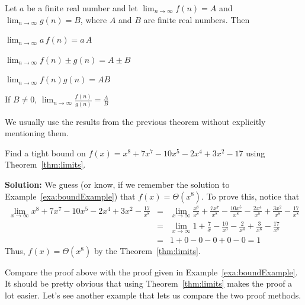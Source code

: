 \begin{thm}\label{limitProps2}
Let $a$ be a finite real number and let $\displaystyle\lim_{n\rightarrow \infty} f(n)=A$ and 
$\displaystyle\lim_{n\rightarrow \infty} g(n)=B$, where $A$ and $B$ are finite real numbers. 
Then
\begin{lenum}
\item 
$\displaystyle \lim_{n\rightarrow \infty} a\,f(n) 
=a\,A$
\item 
$\displaystyle \lim_{n\rightarrow \infty} f(n)\pm g(n) 
=A\pm B$
\item 
$\displaystyle \lim_{n\rightarrow \infty} f(n)g(n) 
=AB$
\item 
If $B\neq 0$, $\displaystyle \lim_{n\rightarrow \infty} \frac{f(n)}{g(n)} 
=\frac{A}{B}$
\end{lenum}
\end{thm}

We usually use the results from the previous theorem without explicitly mentioning them.

\begin{exa}
Find a tight bound on $f(x)=x^8+7x^7-10x^5-2x^4+3x^2-17$ using Theorem~\ref{thm:limits}.

\medskip

\noindent
{\bf Solution:}
We guess (or know, if we remember the solution to Example~\ref{exa:boundExample}) 
that $f(x)=\Theta(x^8)$.
To prove this, notice that 
\begin{eqnarray*}
\lim_{x\rightarrow\infty}
{x^8{+}7x^7{-}10x^5{-}2x^4{+}3x^2{-}\frac{17}{ x^8}}
& =& \lim_{x\rightarrow\infty}
\frac{x^8}{ x^8}+ \frac{7x^7}{ x^8}- \frac{10x^5}{ x^8}- \frac{2x^4}{ x^8}+
\frac{3x^2}{ x^8}- \frac{17}{ x^8}\\
& =& \lim_{x\rightarrow\infty}
 1+ \frac{7}{ x}- \frac{10}{ x^3}- \frac{2}{ x^4}+\frac {3}{ x^6}- \frac{17}{ x^8}\\
&=&1+ 0 - 0 - 0 + 0 - 0=1
\end{eqnarray*}
Thus, $f(x)=\Theta(x^8)$ by the Theorem~\ref{thm:limits}.
\end{exa}

Compare the proof above with the proof given in Example~\ref{exa:boundExample}.
It should be pretty obvious that using Theorem~\ref{thm:limits} makes the proof
a lot easier.  
Let's see another example that lets us compare the two proof methods.

